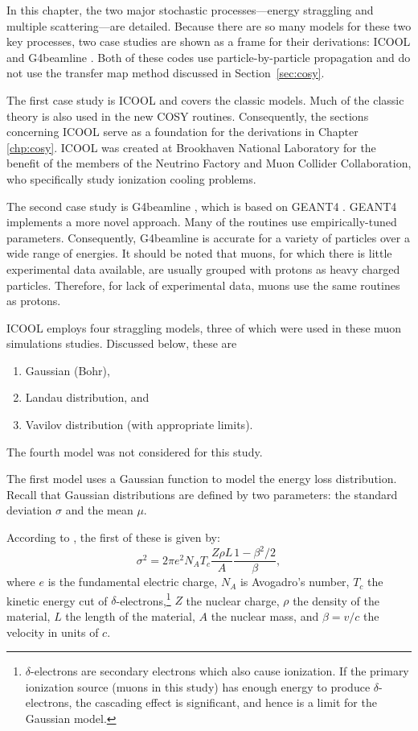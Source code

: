 In this chapter, the two major stochastic processes---energy straggling and multiple scattering---are detailed. Because there are so many models for these two key processes, two case studies are shown as a frame for their derivations: ICOOL \cite{icool} and G4beamline \cite{g4bl}. Both of these codes use particle-by-particle propagation and do not use the transfer map method discussed in Section~\ref{sec:cosy}.

The first case study is ICOOL \cite{icool} and covers the classic models. Much of the classic theory is also used in the new COSY routines. Consequently, the sections concerning ICOOL serve as a foundation for the derivations in Chapter \ref{chp:cosy}. ICOOL was created at Brookhaven National Laboratory for the benefit of the members of the Neutrino Factory and Muon Collider Collaboration, who specifically study ionization cooling problems.

The second case study is G4beamline \cite{g4bl}, which is based on GEANT4 \cite{geant4}. GEANT4 implements a more novel approach. Many of the routines use empirically-tuned parameters. Consequently, G4beamline is accurate for a variety of particles over a wide range of energies. It should be noted that muons, for which there is little experimental data available, are usually grouped with protons as heavy charged particles. Therefore, for lack of experimental data, muons use the same routines as protons.

 \label{sec:ICOOLStraggling}\par
ICOOL \cite{icool} employs four straggling models, three of which were used in these muon simulations studies. Discussed below, these are
\begin{enumerate}
\item{Gaussian (Bohr)},
\item{Landau distribution}, and
\item{Vavilov distribution (with appropriate limits)}.
\end{enumerate}
The fourth model was not considered for this study.

\label{ssc:ICOOLStragglingGaussian} The first model uses a Gaussian function to model the energy loss distribution. Recall that Gaussian distributions are defined by two parameters: the standard deviation $\sigma$ and the mean $\mu$. 

According to \cite{geant4}, the first of these is given by:
\begin{equation}\label{eqn:bohrvariance}
\sigma^2=2\pi e^2 N_A T_c \frac{Z\rho L}{A} \frac{1-\beta^2/2}{\beta},
\end{equation}
where $e$ is the fundamental electric charge, $N_A$ is Avogadro's number, $T_c$ the kinetic energy cut of $\delta$-electrons,\footnote{$\delta$-electrons are secondary electrons which also cause ionization. If the primary ionization source (muons in this study) has enough energy to produce $\delta$-electrons, the cascading effect is significant, and hence is a limit for the Gaussian model.} $Z$ the nuclear charge, $\rho$ the density of the material, $L$ the length of the material, $A$ the nuclear mass, and $\beta=v/c$ the velocity in units of $c$.

